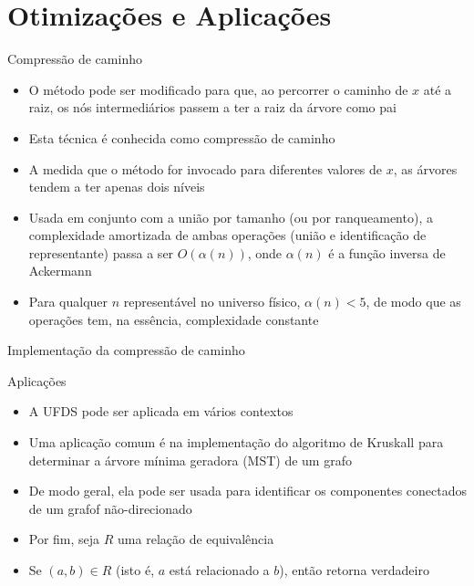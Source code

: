 \section{Otimizações e Aplicações}

\begin{frame}[fragile]{Compressão de caminho}

    \begin{itemize}
        \item O método  pode ser modificado para que, ao percorrer o
            caminho de $x$ até a raiz, os nós intermediários passem a ter a raiz da árvore 
            como pai

        \item Esta técnica é conhecida como compressão de caminho

        \item A medida que o método for invocado para diferentes valores de $x$, as árvores tendem
            a ter apenas dois níveis

        \item Usada em conjunto com a união por tamanho (ou por ranqueamento), a complexidade 
            amortizada de
            ambas operações (união e identificação de representante) passa a ser $O(\alpha(n))$,
            onde $\alpha(n)$ é a função inversa de Ackermann

        \item Para qualquer $n$ representável no universo físico, $\alpha(n) < 5$, de modo que
            as operações tem, na essência, complexidade constante
    \end{itemize}

\end{frame}



\begin{frame}[fragile]{Implementação da compressão de caminho}
\end{frame}

\begin{frame}[fragile]{Aplicações}

    \begin{itemize}
        \item A UFDS pode ser aplicada em vários contextos

        \item Uma aplicação comum é na implementação do algoritmo de Kruskall para determinar a
            árvore mínima geradora (MST) de um grafo

        \item De modo geral, ela pode ser usada para identificar os componentes conectados de
            um grafof não-direcionado

        \item Por fim, seja $R$ uma relação de equivalência

        \item Se $(a, b)\in R$ (isto é, $a$ está relacionado a $b$), então 
             retorna verdadeiro
    \end{itemize}

\end{frame}

